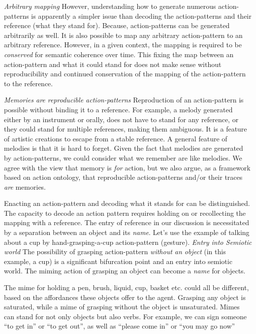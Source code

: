 {{{{{\emph{Arbitrary mapping} However, understanding how to generate numerous action-patterns is apparently a simpler issue than decoding the action-patterns and their reference (what they stand for). Because, action-patterns can be generated arbitrarily as well. It is also possible to map any arbitrary action-pattern to an arbitrary reference. However, in a given context, the mapping is required to be \textit{conserved} for semantic coherence over time. This fixing the map between an action-pattern and what it could stand for does not make sense without reproducibility and continued conservation of the mapping of the action-pattern to the reference. 

\emph{Memories are reproducible action-patterns} Reproduction of an action-pattern is possible without binding it to a reference. For example, a melody generated either by an instrument or orally, does not have to stand for any reference, or they could stand for multiple references, making them ambiguous. It is a feature of artistic creations to escape from a stable reference. A general feature of melodies is that it is hard to forget. Given the fact that melodies are generated by action-patterns, we could consider what we remember are like melodies. We agree with the view that memory is \textit{for} action\cite{glenberg1997memory}, but we also argue, as a framework based on action ontology, that reproducible action-patterns and/or their traces \textit{are} memories. 

Enacting an action-pattern and decoding what it stands for can be distinguished. 
The capacity to decode an action pattern requires holding on or recollecting the mapping with a reference. 
The entry of reference in our discussion is necessitated by a separation between an object and its \textit{name}.
Let's use the example of talking about a cup by hand-grasping-a-cup action-pattern (gesture). 
\emph{Entry into Semiotic world} The possibility of grasping action-pattern \textit{without an object} (in this example, a cup) is a significant bifurcation point and an entry into semiotic world. 
The miming action of grasping an object can become a \textit{name} for objects. 

The mime for holding a pen, brush, liquid, cup, basket etc. could all be different, based on the affordances these objects offer to the agent. Grasping any object is saturated, while a mime of grasping without the object is unsaturated. 
Mimes can stand for not only objects but also verbs. For example, we can sign someone ``to get in'' or ``to get out'', as well as ``please come in'' or ``you may go now''

}}}}}
